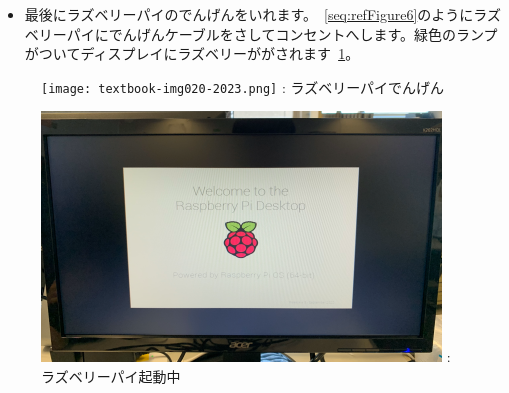 \documentclass[a4paper,12pt]{jarticle}
\begin{document}
\begin{enumerate}
\begin{enumerate}
        \begin{itemize}
          \item
                最後にラズベリーパイのでんげんをいれます。~\ref{seq:refFigure6}のようにラズベリーパイにでんげんケーブルをさしてコンセントへします。緑色のランプがついてディスプレイにラズベリーががされます~\ref{seq:refFigure7}。
        \end{itemize}
        \begin{figure}
          \centering
          \begin{minipage}{0.4\textwidth}
            {\upshape
              \texttt{[image: textbook-img020-2023.png]}
              \newline
              {\theFigure\label{seq:refFigure6}}:
              ラズベリーパイでんげん}
          \end{minipage}
          \begin{minipage}{0.4\textwidth}
            {\upshape
              \includegraphics[width=.9\linewidth]{textbook-img0212023.png}
              \newline
              {\theFigure\label{seq:refFigure7}}:
              ラズベリーパイ起動中}
            \end{minipage}
          \end{figure}

\clearpage
\end{enumerate}



\end{enumerate}
\end{document}
